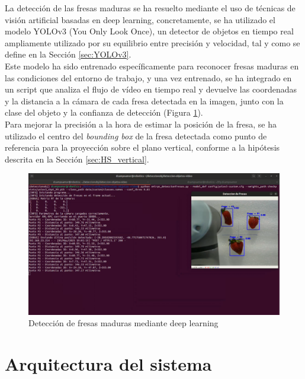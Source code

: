 La detección de las fresas maduras se ha resuelto mediante el uso de técnicas de visión artificial basadas en deep learning, concretamente, se ha utilizado el modelo YOLOv3 (You Only Look Once), un detector de objetos en tiempo real ampliamente utilizado por su equilibrio entre precisión y velocidad, tal y como se define en la Sección \ref{sec:YOLOv3}.\\

Este modelo ha sido entrenado específicamente para reconocer fresas maduras en las condiciones del entorno de trabajo, y una vez entrenado, se ha integrado en un script que analiza el flujo de vídeo en tiempo real y devuelve las coordenadas y la distancia a la cámara de cada fresa detectada en la imagen, junto con la clase del objeto y la confianza de detección (Figura \ref{fig:deteccion_dl}).\\

Para mejorar la precisión a la hora de estimar la posición de la fresa, se ha utilizado el centro del \textit{bounding box} de la fresa detectada como punto de referencia para la proyección sobre el plano vertical, conforme a la hipótesis descrita en la Sección \ref{sec:HS_vertical}.\\

\begin{figure} [H]
    \begin{center}
      \includegraphics[width=15cm]{figs/POV Camara Pruebas plano vertical deteccion multiple UR5e.png}
    \end{center}
    \caption{Detección de fresas maduras mediante deep learning}
    \label{fig:deteccion_dl}
\end{figure}

\section{Arquitectura del sistema}
\label{sec:arquitectura_sistema}


